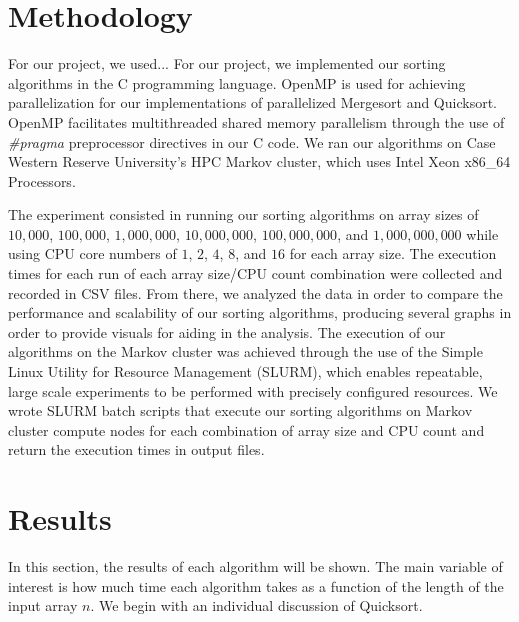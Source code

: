\documentclass[conference]{IEEEtran}
\begin{document}
    \section{Methodology}
	For our project, we used...
    For our project, we implemented our sorting algorithms in the C programming language. OpenMP \cite{openmp08} is used for achieving parallelization for our implementations of parallelized Mergesort and Quicksort.
    OpenMP facilitates multithreaded shared memory parallelism through the use of \textit{\#pragma} preprocessor directives in our C code.
	We ran our algorithms on Case Western Reserve University's HPC Markov cluster, which uses Intel Xeon x86\_64 Processors. 

	The experiment consisted in running our sorting algorithms on array sizes of $10,000$, $100,000$, $1,000,000$, $10,000,000$, $100,000,000$, and $1,000,000,000$ while using CPU core numbers of $1$, $2$, $4$, $8$, and $16$ for each array size. The execution times for each run of each array size/CPU count
	combination were collected and recorded in CSV files. From there, we analyzed the data in order to compare the performance and scalability of our sorting algorithms, producing several graphs in order to provide visuals for aiding in the analysis. The execution of our algorithms on the Markov cluster was achieved through the use of the Simple Linux Utility for Resource Management \cite{yoo_slurm_2003} (SLURM), which enables repeatable, large scale experiments to be performed with precisely configured resources. We wrote SLURM batch scripts that execute our sorting algorithms on Markov cluster compute nodes for each combination of array size and CPU count and return the execution times in output files.
    
    
    \section{Results}
    In this section, the results of each algorithm will be shown. 
    The main variable of interest is how much time each algorithm takes as a function of the length of the input array $n$.
    We begin with an individual discussion of Quicksort. 
    
\end{document}
